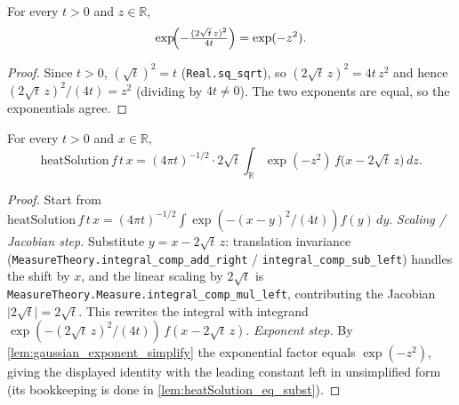 \begin{lemma}
    \label{lem:gaussian_exponent_simplify}
    \leanok
    For every $t > 0$ and $z \in \mathbb{R}$,
    \[ \exp\!\Bigl(-\tfrac{(2\sqrt{t}\,z)^2}{4t}\Bigr) = \exp(-z^2). \]
\end{lemma}
\begin{proof}
    Since $t > 0$, $(\sqrt{t})^2 = t$ (\texttt{Real.sq\_sqrt}), so
    $(2\sqrt{t}\,z)^2 = 4t\,z^2$ and hence $(2\sqrt{t}\,z)^2/(4t) = z^2$ (dividing by
    $4t \neq 0$). The two exponents are equal, so the exponentials agree.
\end{proof}

\begin{lemma}
    \label{lem:heatSolution_change_of_variables}
    \leanok
    For every $t > 0$ and $x \in \mathbb{R}$,
    \[ \mathrm{heatSolution}\,f\,t\,x
       = (4\pi t)^{-1/2}\cdot 2\sqrt{t} \int_{\mathbb{R}}
         \exp(-z^2)\, f\bigl(x - 2\sqrt{t}\,z\bigr)\, dz. \]
\end{lemma}
\begin{proof}
    Start from $\mathrm{heatSolution}\,f\,t\,x = (4\pi t)^{-1/2}\int \exp(-(x-y)^2/(4t)) f(y)\,dy$.
    \emph{Scaling / Jacobian step.} Substitute $y = x - 2\sqrt{t}\,z$: translation
    invariance (\texttt{MeasureTheory.integral\_comp\_add\_right} /
    \texttt{integral\_comp\_sub\_left}) handles the shift by $x$, and the linear scaling
    by $2\sqrt{t}$ is \texttt{MeasureTheory.Measure.integral\_comp\_mul\_left},
    contributing the Jacobian $\lvert 2\sqrt{t}\rvert = 2\sqrt{t}$. This rewrites the
    integral with integrand $\exp(-(2\sqrt{t}\,z)^2/(4t))\, f(x - 2\sqrt{t}\,z)$.
    \emph{Exponent step.} By \cref{lem:gaussian_exponent_simplify} the exponential
    factor equals $\exp(-z^2)$, giving the displayed identity with the leading constant
    left in unsimplified form (its bookkeeping is done in
    \cref{lem:heatSolution_eq_subst}).
\end{proof}

